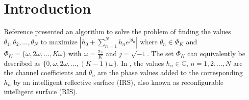 %
\section{Introduction}\label{ch:1}
%
Reference \cite{b1} presented an algorithm to solve the problem of finding the values $\theta_1,
\theta_2, \ldots, \theta_N$ to maximize $| h_0 + \sum_{n=1}^N h_n e^{j\theta_n} |$ where $\theta_n
\in \Phi_K$ and $\Phi_K = \{\omega, 2\omega, \ldots, K\omega\}$ with $\omega=\frac{2\pi}{K}$ and
$j=\sqrt{-1}$. The
set $\Phi_K$ can equivalently be described as $\{ 0, \omega, 2\omega, \ldots , (K-1)\omega\}$. In
\cite{b1}, the values $h_n\in \mathbb{C}$, $n=1,2,\ldots,N$ are the channel coefficients and
$\theta_n$ are the phase values added to the corresponding $h_n$ by an intelligent reflective
surface (IRS), also known as reconfigurable intelligent surface (RIS).
